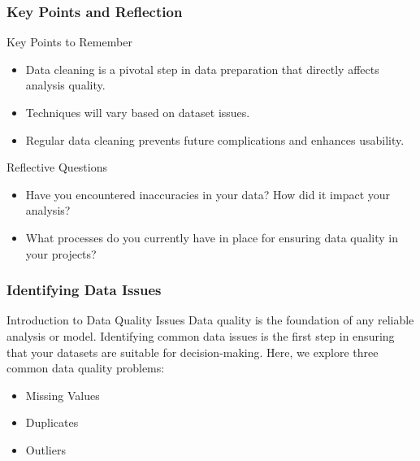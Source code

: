 \documentclass[aspectratio=169]{beamer}
\begin{document}
\begin{frame}[fragile]
    \frametitle{Key Points and Reflection}
    \begin{block}{Key Points to Remember}
        \begin{itemize}
            \item Data cleaning is a pivotal step in data preparation that directly affects analysis quality.
            \item Techniques will vary based on dataset issues.
            \item Regular data cleaning prevents future complications and enhances usability.
        \end{itemize}
    \end{block}
    
    \begin{block}{Reflective Questions}
        \begin{itemize}
            \item Have you encountered inaccuracies in your data? How did it impact your analysis?
            \item What processes do you currently have in place for ensuring data quality in your projects?
        \end{itemize}
    \end{block}
\end{frame}

\begin{frame}[fragile]
    \frametitle{Identifying Data Issues}
    \begin{block}{Introduction to Data Quality Issues}
        Data quality is the foundation of any reliable analysis or model. Identifying common data issues is the first step in ensuring that your datasets are suitable for decision-making. Here, we explore three common data quality problems: 
        \begin{itemize}
            \item Missing Values
            \item Duplicates
            \item Outliers
        \end{itemize}
    \end{block}
\end{frame}
\end{document}

